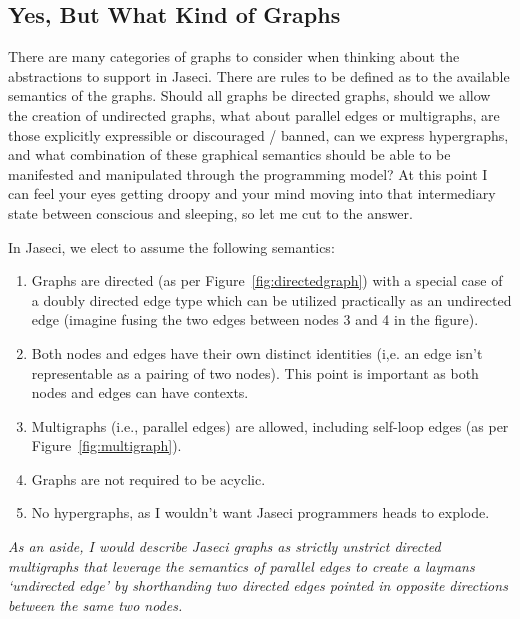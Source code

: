 \subsection{Yes, But What Kind of Graphs}

There are many categories of graphs to consider when thinking about the abstractions to support in Jaseci. There are rules to be defined as to the available semantics of the graphs. Should all graphs be \gls{directed graphs}, should we allow the creation of \gls{undirected graphs}, what about parallel edges or \gls{multigraphs}, are those explicitly expressible or discouraged / banned, can we express \gls{hypergraphs}, and what combination of these graphical semantics should be able to be manifested and manipulated through the programming model? At this point I can feel your eyes getting droopy and your mind moving into that intermediary state between conscious and sleeping, so let me cut to the answer.
\par
\printfigGraphTypes
In Jaseci, we elect to assume the following semantics:
\begin{enumerate}
    \item Graphs are directed (as per Figure~\ref{fig:directedgraph}) with a special case of a doubly directed edge type which can be utilized practically as an undirected edge (imagine fusing the two edges between nodes 3 and 4 in the figure).
    \item Both nodes and edges have their own distinct identities (i,e. an edge isn't representable as a pairing of two nodes). This point is important as both nodes and edges can have \gls{contexts}.
    \item Multigraphs (i.e., parallel edges) are allowed, including self-loop edges (as per Figure~\ref{fig:multigraph}).
    \item Graphs are not required to be acyclic.
    \item No hypergraphs, as I wouldn't want Jaseci programmers heads to explode.

\end{enumerate}
\emph{As an aside, I would describe Jaseci graphs as strictly unstrict directed multigraphs that leverage the semantics of parallel edges to create a laymans `undirected edge' by shorthanding two directed edges pointed in opposite directions between the same two nodes.}
\par

